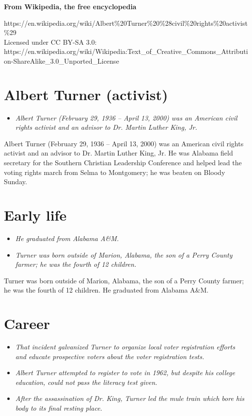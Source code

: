 \textbf{From Wikipedia, the free encyclopedia}

https://en.wikipedia.org/wiki/Albert\%20Turner\%20\%28civil\%20rights\%20activist\%29\\
Licensed under CC BY-SA 3.0:\\
https://en.wikipedia.org/wiki/Wikipedia:Text\_of\_Creative\_Commons\_Attribution-ShareAlike\_3.0\_Unported\_License

\section{Albert Turner (activist)}\label{albert-turner-activist}

\begin{itemize}
\item
  \emph{Albert Turner (February 29, 1936 -- April 13, 2000) was an
  American civil rights activist and an advisor to Dr. Martin Luther
  King, Jr.}
\end{itemize}

Albert Turner (February 29, 1936 -- April 13, 2000) was an American
civil rights activist and an advisor to Dr. Martin Luther King, Jr. He
was Alabama field secretary for the Southern Christian Leadership
Conference and helped lead the voting rights march from Selma to
Montgomery; he was beaten on Bloody Sunday.

\section{Early life}\label{early-life}

\begin{itemize}
\item
  \emph{He graduated from Alabama A\&M.}
\item
  \emph{Turner was born outside of Marion, Alabama, the son of a Perry
  County farmer; he was the fourth of 12 children.}
\end{itemize}

Turner was born outside of Marion, Alabama, the son of a Perry County
farmer; he was the fourth of 12 children. He graduated from Alabama
A\&M.

\section{Career}\label{career}

\begin{itemize}
\item
  \emph{That incident galvanized Turner to organize local voter
  registration efforts and educate prospective voters about the voter
  registration tests.}
\item
  \emph{Albert Turner attempted to register to vote in 1962, but despite
  his college education, could not pass the literacy test given.}
\item
  \emph{After the assassination of Dr. King, Turner led the mule train
  which bore his body to its final resting place.}
\end{itemize}

